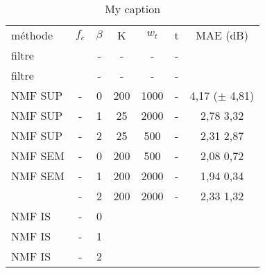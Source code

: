 \begin{itemize}
\begin{table}[]
\centering
\caption{My caption}
\label{my-label}
\begin{tabular}{lcccccc}
méthode & $f_c$ & $\beta$ & K & $w_t$ & t & MAE (dB) \\
filtre &  & - & - & - & - &  \\
filtre &  & - & - & - & - &  \\
NMF SUP & - & 0 & 200 & 1000 & - & 4,17 ($\pm$ 4,81) \\
NMF SUP & - & 1 & 25 & 2000 & - & 2,78 3,32 \\
NMF SUP & - & 2 & 25 & 500 & - & 2,31 2,87 \\
NMF SEM & - & 0 & 200 & 500 & - & 2,08 0,72 \\
NMF SEM & - & 1 & 200 & 2000 & - & 1,94 0,34 \\
 & - & 2 & 200 & 2000 & - & 2,33 1,32 \\
NMF IS & - & 0 &  &  &  &  \\
NMF IS & - & 1 &  &  &  &  \\
NMF IS & - & 2 &  &  &  & 
\end{tabular}
\end{table}


\end{itemize}



%